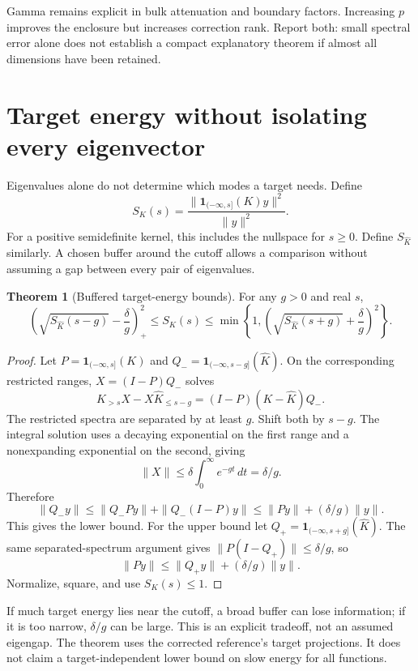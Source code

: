 \documentclass[11pt]{article}
\theoremstyle{definition}
\newtheorem{theorem}[lemma]{Theorem}
\begin{document}
Gamma remains explicit in bulk attenuation and boundary factors. Increasing
$p$ improves the enclosure but increases correction rank. Report both:
small spectral error alone does not establish a compact explanatory theorem
if almost all dimensions have been retained.

\section{Target energy without isolating every eigenvector}
Eigenvalues alone do not determine which modes a target needs. Define
\[
S_K(s)=\frac{\|\mathbf1_{(-\infty,s]}(K)y\|^2}{\|y\|^2}.
\]
For a positive semidefinite kernel, this includes the nullspace for $s\ge0$.
Define $S_{\widehat K}$ similarly. A chosen buffer around the cutoff allows
a comparison without assuming a gap between every pair of eigenvalues.

\begin{theorem}[Buffered target-energy bounds]
For any $g>0$ and real $s$,
\[
\left(\sqrt{S_{\widehat K}(s-g)}-\frac\delta g\right)_+^2
\le S_K(s)
\le\min\!\left\{1,
\left(\sqrt{S_{\widehat K}(s+g)}+\frac\delta g\right)^2\right\}.
\]
\end{theorem}
\begin{proof}
Let $P=\mathbf1_{(-\infty,s]}(K)$ and
$Q_-=\mathbf1_{(-\infty,s-g]}(\widehat K)$.
On the corresponding restricted ranges, $X=(I-P)Q_-$ solves
\[
K_{>s}X-X\widehat K_{\le s-g}
=(I-P)(K-\widehat K)Q_-.
\]
The restricted spectra are separated by at least $g$. Shift both by $s-g$.
The integral solution uses a decaying exponential on the first range and
a nonexpanding exponential on the second, giving
\[
\|X\|\le\delta\int_0^\infty e^{-gt}\,dt=\delta/g.
\]
Therefore
\[
\|Q_-y\|\le\|Q_-Py\|+\|Q_-(I-P)y\|
\le\|Py\|+(\delta/g)\|y\|.
\]
This gives the lower bound. For the upper bound let
$Q_+=\mathbf1_{(-\infty,s+g]}(\widehat K)$.
The same separated-spectrum argument gives $\|P(I-Q_+)\|\le\delta/g$,
so
\[
\|Py\|\le\|Q_+y\|+(\delta/g)\|y\|.
\]
Normalize, square, and use $S_K(s)\le1$.
\end{proof}
If much target energy lies near the cutoff, a broad buffer can lose
information; if it is too narrow, $\delta/g$ can be large. This is an explicit
tradeoff, not an assumed eigengap. The theorem uses the corrected reference's
target projections. It does not claim a target-independent lower bound on
slow energy for all functions.
\end{document}

